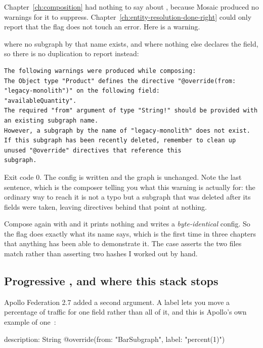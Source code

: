 %
Chapter~\ref{ch:composition} had nothing to say about
, because Mosaic produced no warnings for it to
suppress. Chapter~\ref{ch:entity-resolution-done-right} could only report that
the flag does not touch an error. Here is a warning.

 where no subgraph by that name exists,
and where nothing else declares the field, so there is no duplication to report
instead:

\begin{verbatim}
The following warnings were produced while composing:
The Object type "Product" defines the directive "@override(from: "legacy-monolith")" on the following field:
"availableQuantity".
The required "from" argument of type "String!" should be provided with an existing subgraph name.
However, a subgraph by the name of "legacy-monolith" does not exist.
If this subgraph has been recently deleted, remember to clean up unused "@override" directives that reference this
subgraph.
\end{verbatim}

Exit code 0. The config is written and the graph is unchanged. Note the last
sentence, which is the composer telling you what this warning is actually for:
the ordinary way to reach it is not a typo but a subgraph that was deleted after
its fields were taken, leaving directives behind that point at nothing.

Compose again with  and it prints nothing and writes a
\emph{byte-identical} config. So the flag does exactly what its name says, which
is the first time in three chapters that anything has been able to demonstrate
it. The case asserts the two files match rather than asserting two hashes I
worked out by hand.

\subsection*{Progressive , and where this stack stops}

%
Apollo Federation 2.7 added a second argument. A label lets you move a
percentage of traffic for one field rather than all of it, and this is Apollo's
own example of one~\autocite{apollo2026migratefields}:

\begin{graphqlsdl}[fontsize=\footnotesize]
description: String @override(from: "BarSubgraph", label: "percent(1)")
\end{graphqlsdl}

